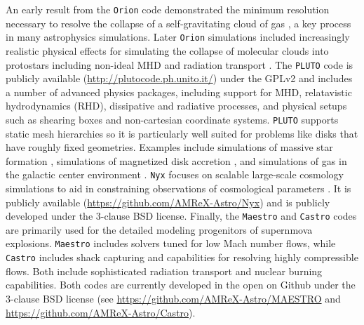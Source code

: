 \documentclass[11pt,twoside]{article}
\begin{document}
An early result from the \texttt{Orion} code \citep{howell2003} demonstrated the minimum resolution necessary to resolve the collapse of a self-gravitating cloud of gas  \citep{truelove1998}, a key process in many astrophysics simulations. Later \texttt{Orion} simulations included increasingly realistic physical effects for simulating the collapse of molecular clouds into protostars including non-ideal MHD and radiation transport \citep{myers2014, rosen2016}. The \texttt{PLUTO} code \citep{mignone2012} is publicly available (\url{http://plutocode.ph.unito.it/}) under the GPLv2 and includes a number of advanced physics packages, including support for MHD, relatavistic hydrodynamics (RHD), dissipative and radiative processes, and physical setups such as shearing boxes and non-cartesian coordinate systems. \texttt{PLUTO} supports static mesh hierarchies so it is particularly well suited for problems like disks that have roughly fixed geometries. Examples include simulations of massive star formation \citep{kuiper2010}, simulations of magnetized disk accretion \citep{lesur2014}, and simulations of gas in the galactic center environment \citep{burkert2012}. \texttt{Nyx} \citep{almgren2013} focuses on scalable large-scale cosmology simulations to aid in constraining observations of cosmological parameters \citep{sorini2016}. It is publicly available (\url{https://github.com/AMReX-Astro/Nyx}) and is publicly developed under the 3-clause BSD license. Finally, the \texttt{Maestro} and \texttt{Castro} codes are primarily used for the detailed modeling progenitors of supernmova explosions. \texttt{Maestro} \citep{nonoka2014} includes solvers tuned for low Mach number flows, while \texttt{Castro} \citep{almgren2010} includes shack capturing and capabilities for resolving highly compressible flows. Both include sophisticated radiation transport and nuclear burning capabilities. Both codes are currently developed in the open on Github under the 3-clause BSD license (see \url{https://github.com/AMReX-Astro/MAESTRO} and \url{https://github.com/AMReX-Astro/Castro}).
\end{document}
